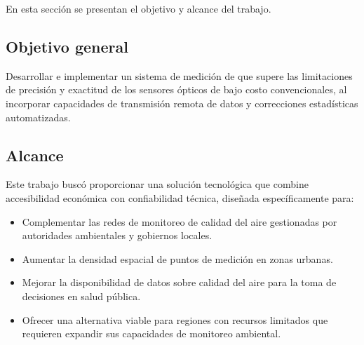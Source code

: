 En esta sección se presentan el objetivo y alcance del trabajo. 

\subsection{Objetivo general}
Desarrollar e implementar un sistema de medición de \MPF que supere las limitaciones de precisión y exactitud de los sensores ópticos de bajo costo convencionales, al incorporar capacidades de transmisión remota de datos y correcciones estadísticas automatizadas.

\subsection{Alcance}
Este trabajo buscó proporcionar una solución tecnológica que combine accesibilidad económica con confiabilidad técnica, diseñada específicamente para:
\begin{itemize}
	\item Complementar las redes de monitoreo de calidad del aire gestionadas por autoridades ambientales y gobiernos locales.
	\item Aumentar la densidad espacial de puntos de medición en zonas urbanas.
	\item Mejorar la disponibilidad de datos sobre calidad del aire para la toma de decisiones en salud pública.
	\item Ofrecer una alternativa viable para regiones con recursos limitados que requieren expandir sus capacidades de monitoreo ambiental.
\end{itemize}



